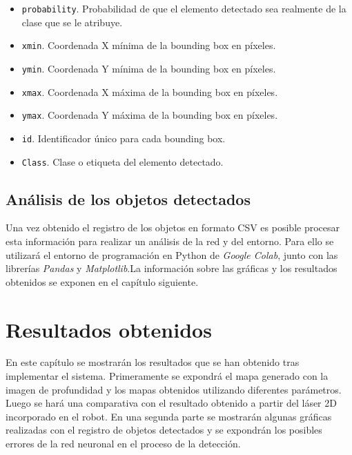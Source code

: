 \begin{itemize}

	\item \texttt{probability}. Probabilidad de que el elemento detectado sea realmente de la clase que se le atribuye.
	\item \texttt{xmin}. Coordenada X mínima de la bounding box en píxeles.
	\item \texttt{ymin}. Coordenada Y mínima de la bounding box en píxeles.
	\item \texttt{xmax}. Coordenada X máxima de la bounding box en píxeles.
	\item \texttt{ymax}. Coordenada Y máxima de la bounding box en píxeles.
	\item \texttt{id}. Identificador único para cada bounding box.
	\item \texttt{Class}. Clase o etiqueta del elemento detectado.

\end{itemize}

\section{Análisis de los objetos detectados}

Una vez obtenido el registro de los objetos en formato CSV es posible procesar esta información para realizar un análisis de la red y del entorno. Para ello se utilizará el entorno de programación en Python de \textit{Google Colab}, junto con las librerías \textit{Pandas} y \textit{Matplotlib}.La información sobre las gráficas y los resultados obtenidos se exponen en el capítulo siguiente.\\

\chapter{Resultados obtenidos} \label{chapter.resultados}

En este capítulo se mostrarán los resultados que se han obtenido tras implementar el sistema. Primeramente se expondrá el mapa generado con la imagen de profundidad y los mapas obtenidos utilizando diferentes parámetros. Luego se hará una comparativa con el resultado obtenido a partir del láser 2D incorporado en el robot. En una segunda parte se mostrarán algunas gráficas realizadas con el registro de objetos detectados y se expondrán los posibles errores de la red neuronal en el proceso de la detección.\\


